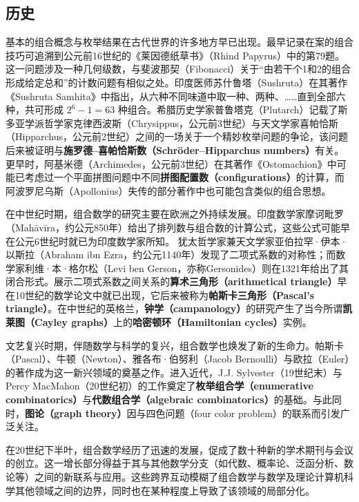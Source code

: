 \subsection{历史}
基本的组合概念与枚举结果在古代世界的许多地方早已出现。最早记录在案的组合技巧可追溯到公元前16世纪的《莱因德纸草书》（Rhind Papyrus）中的第79题。这一问题涉及一种几何级数，与斐波那契（Fibonacci）关于“由若干个1和2的组合形成给定总和”的计数问题有相似之处\cite{ref7}。印度医师苏什鲁塔（Sushruta）在其著作《Sushruta Samhita》中指出，从六种不同味道中取一种、两种、……直到全部六种，共可形成 $2^{6}-1=63$ 种组合。希腊历史学家普鲁塔克（Plutarch）记载了斯多亚学派哲学家克律西波斯（Chrysippus，公元前3世纪）与天文学家喜帕恰斯（Hipparchus，公元前2世纪）之间的一场关于一个精妙枚举问题的争论，该问题后来被证明与\textbf{施罗德–喜帕恰斯数（Schröder–Hipparchus numbers）}有关\cite{ref8,ref9,ref10}。更早时，阿基米德（Archimedes，公元前3世纪）在其著作《Ostomachion》中可能已考虑过一个平面拼图问题中不同\textbf{拼图配置数（configurations）}的计算\cite{ref11}，而阿波罗尼乌斯（Apollonius）失传的部分著作中也可能包含类似的组合思想\cite{ref12,ref13}。

在中世纪时期，组合数学的研究主要在欧洲之外持续发展。印度数学家摩诃毗罗（Mahāvīra，约公元850年）给出了排列数与组合数的计算公式\cite{ref14,ref15}，这些公式可能早在公元6世纪时就已为印度数学家所知\cite{ref16}。  
犹太哲学家兼天文学家亚伯拉罕·伊本·以斯拉（Abraham ibn Ezra，约公元1140年）发现了二项式系数的对称性；而数学家利维·本·格尔松（Levi ben Gerson，亦称Gersonides）则在1321年给出了其闭合形式\cite{ref17}。展示二项式系数之间关系的\textbf{算术三角形（arithmetical triangle）}早在10世纪的数学论文中就已出现，它后来被称为\textbf{帕斯卡三角形（Pascal’s triangle）}。在中世纪的英格兰，\textbf{钟学（campanology）}的研究产生了当今所谓\textbf{凯莱图（Cayley graphs）}上的\textbf{哈密顿环（Hamiltonian cycles）}实例\cite{ref18,ref19}。

文艺复兴时期，伴随数学与科学的复兴，组合数学也焕发了新的生命力。帕斯卡（Pascal）、牛顿（Newton）、雅各布·伯努利（Jacob Bernoulli）与欧拉（Euler）的著作成为这一新兴领域的奠基之作。进入近代，J.J. Sylvester（19世纪末）与 Percy MacMahon（20世纪初）的工作奠定了\textbf{枚举组合学（enumerative combinatorics）}与\textbf{代数组合学（algebraic combinatorics）}的基础。与此同时，\textbf{图论（graph theory）}因与四色问题（four color problem）的联系而引发广泛关注。

在20世纪下半叶，组合数学经历了迅速的发展，促成了数十种新的学术期刊与会议的创立\cite{ref20}。这一增长部分得益于其与其他数学分支（如代数、概率论、泛函分析、数论等）之间的新联系与应用。这些跨界互动模糊了组合数学与数学及理论计算机科学其他领域之间的边界，同时也在某种程度上导致了该领域的局部分化。

